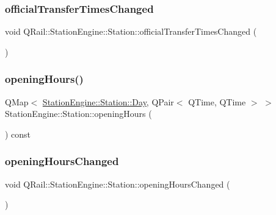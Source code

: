 \subsubsection{\texorpdfstring{officialTransferTimesChanged}{officialTransferTimesChanged}}
{\footnotesize\ttfamily void Q\+Rail\+::\+Station\+Engine\+::\+Station\+::official\+Transfer\+Times\+Changed (\begin{DoxyParamCaption}{ }\end{DoxyParamCaption})\hspace{0.3cm}{\ttfamily [signal]}}

\mbox{\label{classQRail_1_1StationEngine_1_1Station_a952190a3454e31982d35cc3afd7d7d34}} 
\subsubsection{\texorpdfstring{openingHours()}{openingHours()}}
{\footnotesize\ttfamily Q\+Map$<$ \mbox{\hyperlink{classQRail_1_1StationEngine_1_1Station_ae8c109a1d5ce2bb41959e62e32392631}{Station\+Engine\+::\+Station\+::\+Day}}, Q\+Pair$<$ Q\+Time, Q\+Time $>$ $>$ Station\+Engine\+::\+Station\+::opening\+Hours (\begin{DoxyParamCaption}{ }\end{DoxyParamCaption}) const}

\mbox{\label{classQRail_1_1StationEngine_1_1Station_a6dda0c58b3e6e9cbb4d4868ab785b088}} 
\subsubsection{\texorpdfstring{openingHoursChanged}{openingHoursChanged}}
{\footnotesize\ttfamily void Q\+Rail\+::\+Station\+Engine\+::\+Station\+::opening\+Hours\+Changed (\begin{DoxyParamCaption}{ }\end{DoxyParamCaption})\hspace{0.3cm}{\ttfamily [signal]}}

